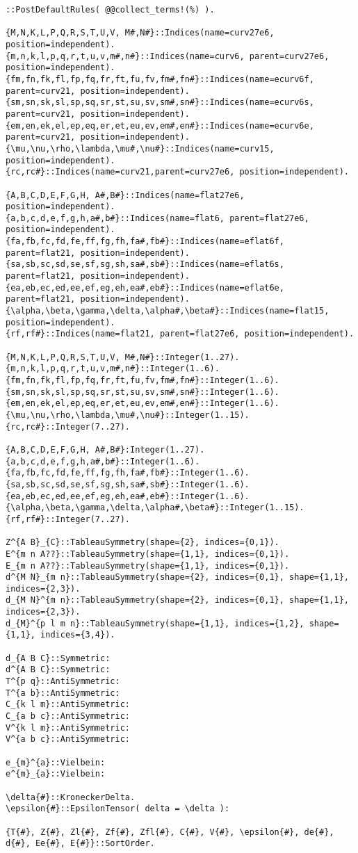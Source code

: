 \documentclass[11pt]{article}
\begin{document}
{\color[named]{Blue}\begin{verbatim}
::PostDefaultRules( @@collect_terms!(%) ).

{M,N,K,L,P,Q,R,S,T,U,V, M#,N#}::Indices(name=curv27e6, position=independent).
{m,n,k,l,p,q,r,t,u,v,m#,n#}::Indices(name=curv6, parent=curv27e6, position=independent).
{fm,fn,fk,fl,fp,fq,fr,ft,fu,fv,fm#,fn#}::Indices(name=ecurv6f, parent=curv21, position=independent).
{sm,sn,sk,sl,sp,sq,sr,st,su,sv,sm#,sn#}::Indices(name=ecurv6s, parent=curv21, position=independent).
{em,en,ek,el,ep,eq,er,et,eu,ev,em#,en#}::Indices(name=ecurv6e, parent=curv21, position=independent).
{\mu,\nu,\rho,\lambda,\mu#,\nu#}::Indices(name=curv15, position=independent).
{rc,rc#}::Indices(name=curv21,parent=curv27e6, position=independent).

{A,B,C,D,E,F,G,H, A#,B#}::Indices(name=flat27e6, position=independent).
{a,b,c,d,e,f,g,h,a#,b#}::Indices(name=flat6, parent=flat27e6, position=independent).
{fa,fb,fc,fd,fe,ff,fg,fh,fa#,fb#}::Indices(name=eflat6f, parent=flat21, position=independent).
{sa,sb,sc,sd,se,sf,sg,sh,sa#,sb#}::Indices(name=eflat6s, parent=flat21, position=independent).
{ea,eb,ec,ed,ee,ef,eg,eh,ea#,eb#}::Indices(name=eflat6e, parent=flat21, position=independent).
{\alpha,\beta,\gamma,\delta,\alpha#,\beta#}::Indices(name=flat15, position=independent).
{rf,rf#}::Indices(name=flat21, parent=flat27e6, position=independent).

{M,N,K,L,P,Q,R,S,T,U,V, M#,N#}::Integer(1..27).
{m,n,k,l,p,q,r,t,u,v,m#,n#}::Integer(1..6).
{fm,fn,fk,fl,fp,fq,fr,ft,fu,fv,fm#,fn#}::Integer(1..6).
{sm,sn,sk,sl,sp,sq,sr,st,su,sv,sm#,sn#}::Integer(1..6).
{em,en,ek,el,ep,eq,er,et,eu,ev,em#,en#}::Integer(1..6).
{\mu,\nu,\rho,\lambda,\mu#,\nu#}::Integer(1..15).
{rc,rc#}::Integer(7..27).

{A,B,C,D,E,F,G,H, A#,B#}:Integer(1..27).
{a,b,c,d,e,f,g,h,a#,b#}::Integer(1..6).
{fa,fb,fc,fd,fe,ff,fg,fh,fa#,fb#}::Integer(1..6).
{sa,sb,sc,sd,se,sf,sg,sh,sa#,sb#}::Integer(1..6).
{ea,eb,ec,ed,ee,ef,eg,eh,ea#,eb#}::Integer(1..6).
{\alpha,\beta,\gamma,\delta,\alpha#,\beta#}::Integer(1..15).
{rf,rf#}::Integer(7..27).

Z^{A B}_{C}::TableauSymmetry(shape={2}, indices={0,1}).
E^{m n A??}::TableauSymmetry(shape={1,1}, indices={0,1}).
E_{m n A??}::TableauSymmetry(shape={1,1}, indices={0,1}).
d^{M N}_{m n}::TableauSymmetry(shape={2}, indices={0,1}, shape={1,1}, indices={2,3}).
d_{M N}^{m n}::TableauSymmetry(shape={2}, indices={0,1}, shape={1,1}, indices={2,3}).
d_{M}^{p l m n}::TableauSymmetry(shape={1,1}, indices={1,2}, shape={1,1}, indices={3,4}).

d_{A B C}::Symmetric:
d^{A B C}::Symmetric:
T^{p q}::AntiSymmetric:
T^{a b}::AntiSymmetric:
C_{k l m}::AntiSymmetric:
C_{a b c}::AntiSymmetric:
V^{k l m}::AntiSymmetric:
V^{a b c}::AntiSymmetric:

e_{m}^{a}::Vielbein:
e^{m}_{a}::Vielbein:

\delta{#}::KroneckerDelta.
\epsilon{#}::EpsilonTensor( delta = \delta ):

{T{#}, Z{#}, Zl{#}, Zf{#}, Zfl{#}, C{#}, V{#}, \epsilon{#}, de{#}, d{#}, Ee{#}, E{#}}::SortOrder.
\end{verbatim}}
\end{document}
